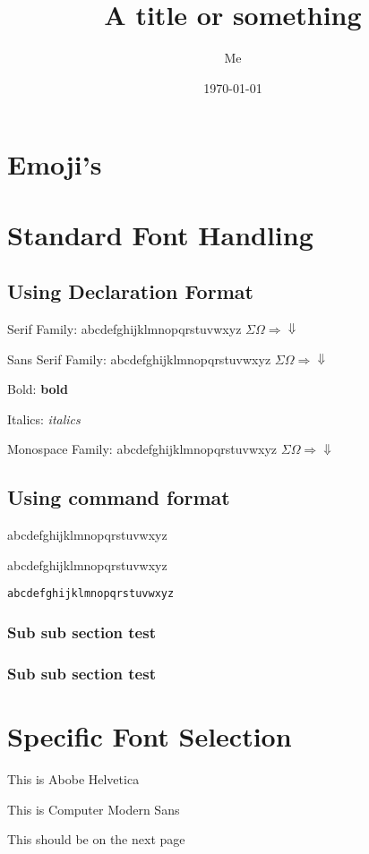 \documentclass[11pt]{article}
\title{A title or something}
\author{Me}
\date{\today}
\begin{document}
\section{Emoji's}


\section{Standard Font Handling}

\subsection{Using Declaration Format}

\rmfamily 
Serif Family:
abcdefghijklmnopqrstuvwxyz
$\Sigma \Omega \Longrightarrow \Downarrow$

\sffamily 
Sans Serif Family:
abcdefghijklmnopqrstuvwxyz
$\Sigma \Omega \Longrightarrow \Downarrow$

Bold: \textbf{bold}\par
Italics: \textit{italics}

\ttfamily 
Monospace Family:
abcdefghijklmnopqrstuvwxyz
$\Sigma \Omega \Longrightarrow \Downarrow$

\subsection{Using command format}

\textsf{abcdefghijklmnopqrstuvwxyz}\par
\textrm{abcdefghijklmnopqrstuvwxyz}\par
\texttt{abcdefghijklmnopqrstuvwxyz}

\subsubsection*{Sub sub section test}

\subsubsection{Sub sub section test}

\section{Specific Font Selection}

{
    This is Abobe Helvetica
}
    
{
    This is Computer Modern Sans
}
  
\pagebreak

This should be on the next page
\end{document}
